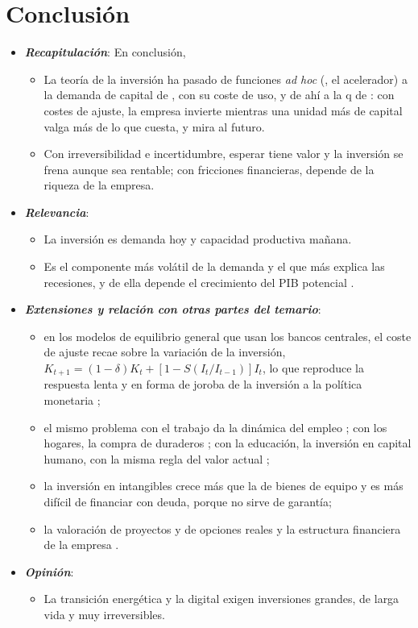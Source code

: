 \documentclass[11pt]{article}
\begin{document}
\section*{Conclusión}

\begin{itemize}
\item \textbf{\emph{Recapitulación}}: En conclusión,
  \begin{itemize}
  \item La teoría de la inversión ha pasado de funciones \emph{ad hoc} (, el acelerador) a la demanda de capital de , con su coste de uso, y de ahí a la q de : con costes de ajuste, la empresa invierte mientras una unidad más de capital valga más de lo que cuesta, y mira al futuro.

  \item Con irreversibilidad e incertidumbre, esperar tiene valor y la inversión se frena aunque sea rentable; con fricciones financieras, depende de la riqueza de la empresa.
  \end{itemize}
\item \textbf{\emph{Relevancia}}:
  \begin{itemize}
  \item La inversión es demanda hoy y capacidad productiva mañana.

  \item Es el componente más volátil de la demanda y el que más explica las recesiones, y de ella depende el crecimiento del PIB potencial .
  \end{itemize}
\item \textbf{\emph{Extensiones y relación con otras partes del temario}}:
  \begin{itemize}
  \item en los modelos de equilibrio general que usan los bancos centrales, el coste de ajuste recae sobre la variación de la inversión, $K_{t+1}=(1-\delta)K_t+\left[1-S(I_t/I_{t-1})\right]I_t$, lo que reproduce la respuesta lenta y en forma de joroba de la inversión a la política monetaria\nocite{ChristianoEichenbaumEvans2005,SmetsWouters2007Shocks} ;
  \item el mismo problema con el trabajo da la dinámica del empleo ; con los hogares, la compra de duraderos ; con la educación, la inversión en capital humano, con la misma regla del valor actual ;
  \item la inversión en intangibles crece más que la de bienes de equipo y es más difícil de financiar con deuda, porque no sirve de garantía\nocite{HaskelWestlake2017Capitalism};
  \item la valoración de proyectos y de opciones reales  y la estructura financiera de la empresa .
  \end{itemize}
\item \textbf{\emph{Opinión}}:
  \begin{itemize}
  \item La transición energética y la digital exigen inversiones grandes, de larga vida y muy irreversibles.


\end{itemize}
\end{itemize}
\end{document}
